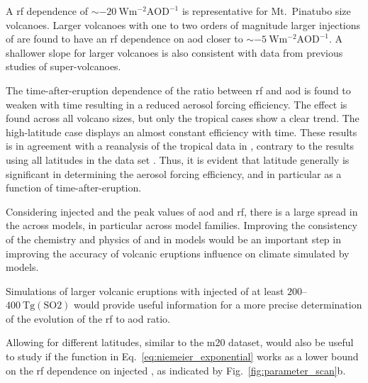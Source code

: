 \documentclass{ametsocV6.1}
\newcommand{\iso}[1][i]{{#1}njected \ce{SO2}}
\begin{document}
A \gls{rf}
dependence of \(\sim\SI{-20}{\watt\metre^{-2}\mathrm{AOD}^{-1}}\) is representative for
Mt.\ Pinatubo size volcanoes. Larger volcanoes with one to two orders of magnitude
larger injections of  are found to have an \gls{rf} dependence on \gls{aod}
closer to \(\sim \SI{-5}{\watt\metre^{-2}\mathrm{AOD}^{-1}}\). A shallower slope for
larger volcanoes is also consistent with data from previous studies of super-volcanoes.

The time-after-eruption dependence of the ratio between \gls{rf} and \gls{aod} is found
to weaken with time resulting in a reduced aerosol forcing efficiency. The effect is
found across all volcano sizes, but only the tropical cases show a clear trend. The
high-latitude case displays an almost constant efficiency with time. These results is in agreement with a reanalysis of the tropical data in \citet{marshall2020dataset}, contrary to the results using all latitudes in the data set \citet{marshall2020}.
Thus, it is evident that latitude generally is significant in determining the aerosol forcing
efficiency, and in particular as a function of time-after-eruption.

Considering \iso{} and the peak values of \gls{aod} and \gls{rf}, there is a large spread in the across models, in particular across model families. Improving the consistency of the
chemistry and physics of  and  in models would be an important step in
improving the accuracy of volcanic eruptions influence on climate simulated by models.

Simulations of larger volcanic eruptions with \iso{} of at least
\(200\)--\(\SI{400}{\tera\gram(\mathrm{SO2})}\) would provide useful information for a
more precise determination of the evolution of the \gls{rf} to \gls{aod} ratio.

Allowing for different latitudes, similar to the \gls{m20} dataset, would also be useful to study
if the function in Eq.~\ref{eq:niemeier_exponential} works as a lower bound on the
\gls{rf} dependence on \iso{}, as indicated by Fig.~\ref{fig:parameter_scan}b.

\clearpage
\acknowledgments{}
\end{document}
